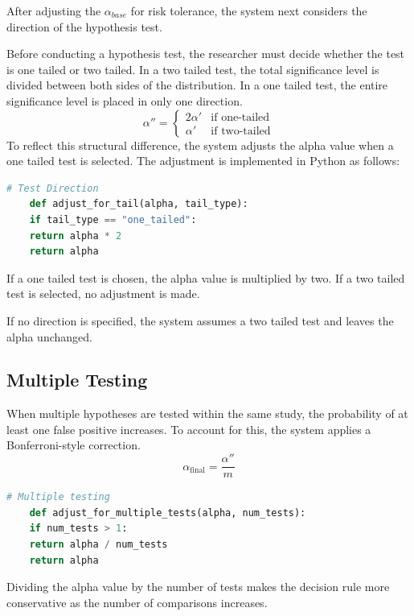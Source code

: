 {After adjusting the $\alpha_{base}$ for risk tolerance, the system next considers the direction of the hypothesis test.

Before conducting a hypothesis test, the researcher must decide whether the test is one tailed or two tailed. In a two tailed test, the total significance level is divided between both sides of the distribution. In a one tailed test, the entire significance level is placed in only one direction.\cite{Hales2023}
\begin{equation}
	\alpha'' =
	\begin{cases}
		2\alpha' & \text{if one-tailed} \\
		\alpha'  & \text{if two-tailed}
	\end{cases}
\end{equation}
To reflect this structural difference, the system adjusts the alpha value when a one tailed test is selected. The adjustment is implemented in Python as follows:

\begin{lstlisting}[language=Python]
	# Test Direction
	def adjust_for_tail(alpha, tail_type):
	if tail_type == "one_tailed":
	return alpha * 2
	return alpha
\end{lstlisting}

If a one tailed test is chosen, the alpha value is multiplied by two. If a two tailed test is selected, no adjustment is made.

If no direction is specified, the system assumes a two tailed test and leaves the alpha unchanged.

\subsection{Multiple Testing}

When multiple hypotheses are tested within the same study, the probability of at least one false positive increases. To account for this, the system applies a Bonferroni-style correction\cite{Herzog2019}.
\begin{equation}
	\alpha_{\text{final}} 
	= 
	\frac{\alpha''}{m}
\end{equation}
\begin{lstlisting}[language=Python]
	# Multiple testing
	def adjust_for_multiple_tests(alpha, num_tests):
	if num_tests > 1:
	return alpha / num_tests
	return alpha
\end{lstlisting}

Dividing the alpha value by the number of tests makes the decision rule more conservative as the number of comparisons increases.

}
